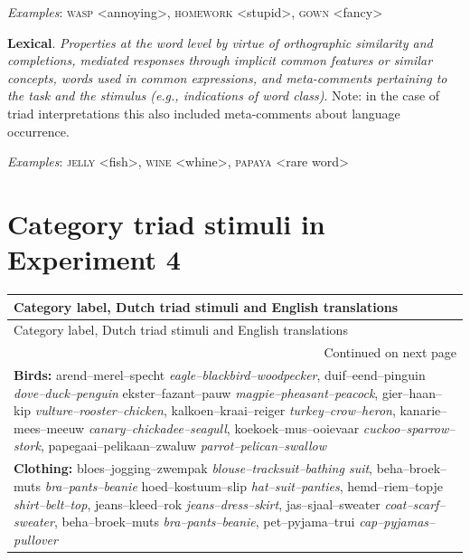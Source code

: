 \documentclass[doc]{apa6}
\newcommand{\stimulus}[1]{\textsc{#1}}
\begin{document}
\begin{appendix}
{\noindent\textit{Examples}: \stimulus{wasp} <annoying>, \stimulus{homework} <stupid>, \stimulus{gown} <fancy>

\smallskip

\noindent\textbf{Lexical}.
\noindent \textit{Properties at the word level by virtue of orthographic similarity and completions, mediated
responses through implicit common features or similar concepts, words used in common expressions, and meta-comments pertaining to the task and the stimulus (e.g., indications of word class)}.
Note: in the case of triad interpretations this also included meta-comments about language occurrence.

\noindent\textit{Examples}: \stimulus{jelly} <fish>, \stimulus{wine} <whine>, \stimulus{papaya} <rare word>
} %
\clearpage


\section{Category triad stimuli in Experiment 4}

\begin{small}
\begin{longtable}{p{14cm}}


Category label, Dutch triad stimuli and English translations \\
\toprule
\endfirsthead

Category label, Dutch triad stimuli and English translations\\
\toprule
\endhead


\bottomrule
\multicolumn{1}{r}{Continued on next page} \\
\endfoot

\bottomrule
\endlastfoot

\textbf{Birds:} arend--merel--specht \textit{eagle--blackbird--woodpecker},  duif--eend--pinguin \textit{ dove--duck--penguin}
ekster--fazant--pauw \textit{magpie--pheasant--peacock}, gier--haan--kip \textit{ vulture--rooster--chicken},
kalkoen--kraai--reiger \textit{turkey--crow--heron}, kanarie--mees--meeuw \textit{ canary--chickadee--seagull},
koekoek--mus--ooievaar \textit{cuckoo--sparrow--stork}, papegaai--pelikaan--zwaluw \textit{ parrot--pelican--swallow}
\smallskip \\

\textbf{Clothing:} bloes--jogging--zwempak \textit{blouse--tracksuit--bathing suit}, beha--broek--muts \textit{ bra--pants--beanie}
hoed--kostuum--slip \textit{hat--suit--panties}, hemd--riem--topje \textit{ shirt--belt--top},
jeans--kleed--rok \textit{jeans--dress--skirt}, jas--sjaal--sweater \textit{ coat--scarf--sweater},
beha--broek--muts \textit{bra--pants--beanie}, pet--pyjama--trui \textit{ cap--pyjamas--pullover}
\smallskip \\


\end{longtable}
\end{small}
\end{appendix}
\end{document}
